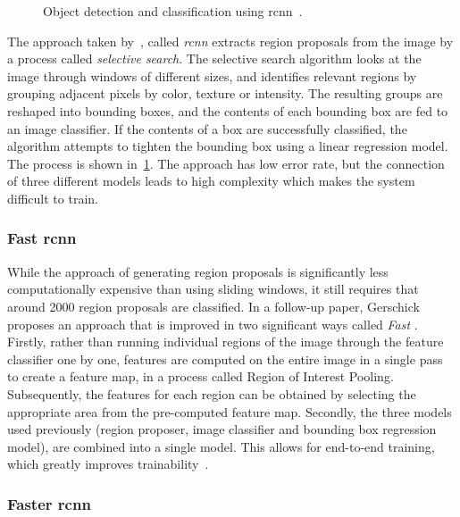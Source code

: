 \documentclass[\rootfolder/main.tex]{subfiles}
\begin{document}
\begin{figure}
    \caption[Object detection and classification using \acrshort{rcnn}.]{Object detection and classification using \acrshort{rcnn}~\cite{Girshick2013}.}
    \label{fig:r-cnn}
\end{figure}

The approach taken by~\cite{Girshick2013}, called \emph{\acrfull{rcnn}} extracts region proposals from the image by a process called \emph{selective search}.
The selective search algorithm looks at the image through windows of different sizes, and identifies relevant regions by grouping adjacent pixels by color, texture or intensity.
The resulting groups are reshaped into bounding boxes, and the contents of each bounding box are fed to an image classifier.
If the contents of a box are successfully classified, the algorithm attempts to tighten the bounding box using a linear regression model.
The process is shown in~\cref{fig:r-cnn}.
The approach has low error rate, but the connection of three different models leads to high complexity which makes the system difficult to train.

\subsubsection{Fast \acrshort{rcnn}}

While the approach of generating region proposals is significantly less computationally expensive than using sliding windows, it still requires that around 2000 region proposals are classified.
In a follow-up paper, Gerschick proposes an approach that is improved in two significant ways called \emph{Fast }.
Firstly, rather than running individual regions of the image through the feature classifier one by one, features are computed on the entire image in a single pass to create a feature map, in a process called Region of Interest Pooling.
Subsequently, the features for each region can be obtained by selecting the appropriate area from the pre-computed feature map.
Secondly, the three models used previously (region proposer, image classifier and bounding box regression model), are combined into a single model.
This allows for end-to-end training, which greatly improves trainability~\cite{Girshick2015}.

\subsubsection{Faster \acrshort{rcnn}}
\end{document}
